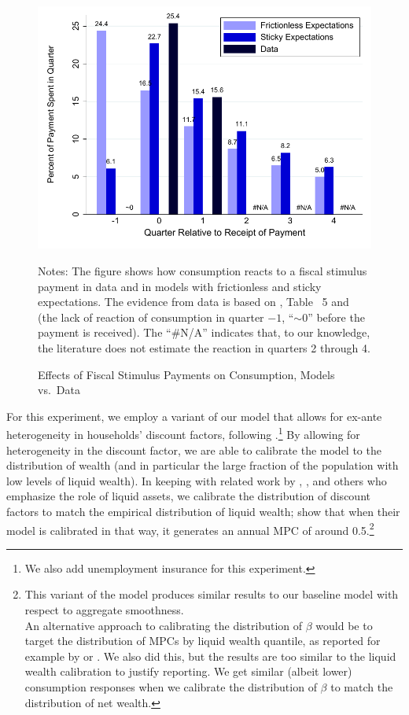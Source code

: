 \documentclass[titlepage]{article}
\begin{document}
\begin{figure}
  \centering
\caption{Effects of Fiscal Stimulus Payments on Consumption, Models vs.\ Data}
\label{parker}
{ \includegraphics[width=1.0\textwidth]{./Figures/parkerExperiment}}

\begin{flushleft}
  \footnotesize Notes: The figure shows how consumption reacts to a fiscal stimulus payment in data and in models with frictionless and sticky expectations. The evidence from data is based on \cite{psjmMPC2008}, Table ~5 and \cite{brodaParker} (the lack of reaction of consumption in quarter $-1$, ``$\sim0$'' before the payment is received). The ``\#N/A'' indicates that, to our knowledge, the literature does not estimate the reaction in quarters 2 through 4.
  \normalsize
  \end{flushleft}
\end{figure}

For this experiment, we employ a variant of our model that allows for ex-ante heterogeneity in households' discount factors, following \cite{cstwMPC}.\footnote{We also add unemployment insurance for this experiment.} By allowing for heterogeneity in the discount factor, we are able to calibrate the model to the distribution of wealth (and in particular the large fraction of the population with low levels of liquid wealth).  In keeping with related work by \cite{kvwWealthyH2m}, \cite{kmvHANK}, and others who emphasize the role of liquid assets, we calibrate the distribution of discount factors to match the empirical distribution of liquid wealth; \cite{cstwMPC} show that when their model is calibrated in that way, it generates an annual MPC of around 0.5.\footnote{This variant of the model produces similar results to our baseline model with respect to aggregate smoothness.\\
An alternative approach to calibrating the distribution of $\beta$ would be to target the distribution of MPCs by liquid wealth quantile, as reported for example by \cite{fhnMPC} or \cite{ckConsumption}. We also did this, but the results are too similar to the liquid wealth calibration to justify reporting.  We get similar (albeit lower) consumption responses when we calibrate the distribution of $\beta$ to match the distribution of net wealth.}
\end{document}
